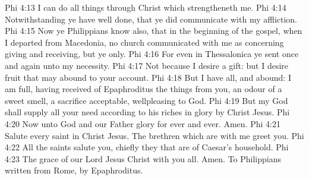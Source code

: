 \vs Phi 4:13 I can do all things through Christ which strengtheneth me.
\vs Phi 4:14 Notwithstanding ye have well done, that ye did communicate with my affliction.
\vs Phi 4:15 Now ye Philippians know also, that in the beginning of the gospel, when I departed from Macedonia, no church communicated with me as concerning giving and receiving, but ye only.
\vs Phi 4:16 For even in Thessalonica ye sent once and again unto my necessity.
\vs Phi 4:17 Not because I desire a gift: but I desire fruit that may abound to your account.
\vs Phi 4:18 But I have all, and abound: I am full, having received of Epaphroditus the things  from you, an odour of a sweet smell, a sacrifice acceptable, wellpleasing to God.
\vs Phi 4:19 But my God shall supply all your need according to his riches in glory by Christ Jesus.
\vs Phi 4:20 Now unto God and our Father  glory for ever and ever. Amen.
\vs Phi 4:21 Salute every saint in Christ Jesus. The brethren which are with me greet you.
\vs Phi 4:22 All the saints salute you, chiefly they that are of Caesar's household.
\enlargethispage*{\baselineskip}
\vs Phi 4:23 The grace of our Lord Jesus Christ  with you all. Amen. To  Philippians written from Rome, by Epaphroditus.

